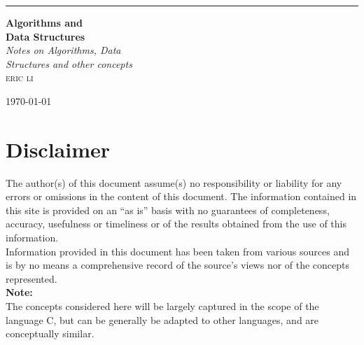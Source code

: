 \documentclass[hidelinks,11pt]{article}
\begin{document}
\begin{titlepage} %

	\raggedleft %
	\rule{1pt}{\textheight} %
	\hspace{0.05\textwidth} %
	\parbox[b]{0.75\textwidth}{ %
        {\Huge\bfseries Algorithms and\\[0.5\baselineskip]Data Structures }\\[2\baselineskip] %
        
        {\large\textit{Notes on Algorithms, Data \\[0.5\baselineskip]Structures and other concepts}}\\[4\baselineskip] %
        
        {\Large\textsc{eric li}} %
        
        \vspace{0.5\textheight} %
        
        {\noindent\large\today}\\[\baselineskip]
    }
\end{titlepage}
\tableofcontents
\newpage
\section{Disclaimer}
The author(s) of this document assume(s) no responsibility or liability for any errors or omissions in the content of this document. The information contained in this site is provided on an “as is” basis with no guarantees of completeness, accuracy, usefulness or timeliness or of the results obtained from the use of this information.\\[0.5\baselineskip]
Information provided in this document has been taken from various sources and is by no means a comprehensive record of the source's views nor of the concepts represented.\\[1\baselineskip]
\textbf{Note:}\\
The concepts considered here will be largely captured in the scope of the language C, but can be generally be adapted to other languages, and are conceptually similar.
\end{document}
